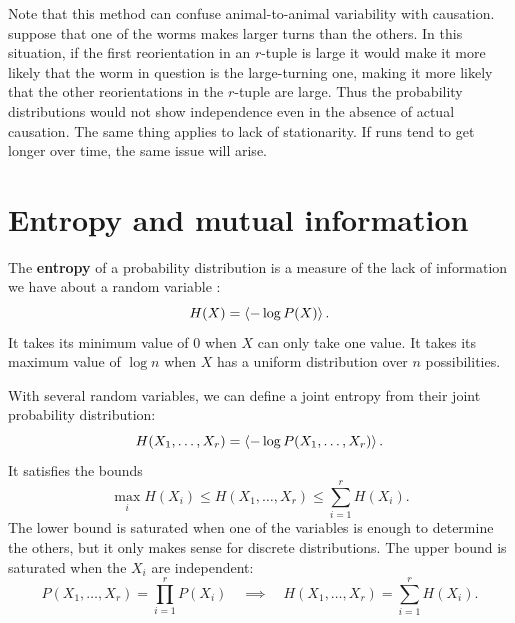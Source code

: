 \documentclass[12pt]{article}
\begin{document}
Note that this method can confuse animal-to-animal variability with causation. \Eg suppose that one of the worms makes larger turns than the others. In this situation, if the first reorientation in an $r$-tuple is large it would make it more likely that the worm in question is the large-turning one, making it more likely that the other reorientations in the $r$-tuple are large. Thus the probability distributions would not show independence even in the absence of actual causation. The same thing applies to lack of stationarity. If runs tend to get longer over time, the same issue will arise.


\section{Entropy and mutual information}\label{sec:entropy}

The \textbf{entropy} of a probability distribution is a measure of the lack of information we have about a random variable \cite{Cover:2006}:
%
\begin{equation}\label{eq:ent}
  H(X) = \left\langle -\log P(X) \right\rangle.
\end{equation}
%
It takes its minimum value of $0$ when $X$ can only take one value. It takes its maximum value of $\log n$ when $X$ has a uniform distribution over $n$ possibilities.

With several random variables, we can define a joint entropy from their joint probability distribution:
%
\begin{equation}\label{eq:jointent}
  H(X_1,\ldots,X_r) = \left\langle -\log P(X_1,\ldots,X_r) \right\rangle.
\end{equation}
%
It satisfies the bounds
%
\begin{equation}\label{eq:entbounds}
  \max_i H(X_i) \leq H(X_1,\ldots,X_r) \leq \sum_{i=1}^r H(X_i).
\end{equation}
%
The lower bound is saturated when one of the variables is enough to determine the others, but it only makes sense for discrete distributions. The upper bound is saturated when the $X_i$ are independent:
%
\begin{equation}\label{eq:indent}
  P(X_1,\ldots,X_r) = \prod_{i=1}^r P(X_i)
  \quad \implies \quad
  H(X_1,\ldots,X_r) = \sum_{i=1}^r H(X_i).
\end{equation}
%
\end{document}

